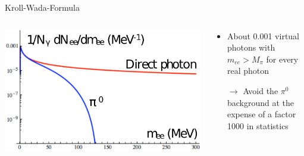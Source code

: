 \documentclass[aspectratio=169,10pt]{beamer}
\begin{document}
\begin{frame}{Kroll-Wada-Formula}
\begin{columns}
      \begin{column}{6.8cm}
        \includegraphics[width=\textwidth]{EMLectureWeek2018/krollwada.pdf}
      \end{column}
      \begin{column}{8.5cm}
       \begin{itemize}
        \item About 0.001 virtual photons with $m_{ee} > M_{\pi}$ for every real photon
        \item [$\rightarrow$] Avoid the $\pi^0$ background at the expense of a factor 1000 in statistics
       \end{itemize}
      \end{column}
    \end{columns}
  \end{frame}
\end{document}
